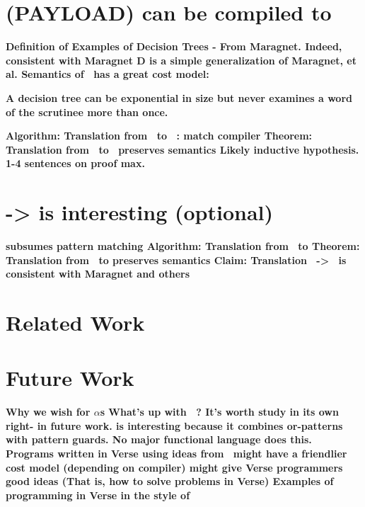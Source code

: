 \documentclass[manuscript,screen,review, 12pt]{acmart}
\begin{document}
\section{(PAYLOAD) {\VMinus} can be compiled to }
\begin{outline}[enumerate]
     \bf{Definition of \D }
     \bf{Examples of Decision Trees - From Maragnet. }
     \bf{Indeed, consistent with Maragnet }
     \bf{D is a simple generalization of Maragnet, et al. }
     \bf{Semantics of \D }
     \bf{\D\ has a great cost model: }

    \bf{A decision tree can be exponential in size but never examines a word of
    the scrutinee more than once. }

     \bf{Algorithm: Translation from \VMinus\ to \D\ : match compiler }
     \bf{Theorem: Translation from \VMinus\ to \D\ preserves semantics }
     \bf{Likely inductive hypothesis. 1-4 sentences on proof max. }
\end{outline}

\section{\PPlus -> \VMinus is interesting (optional)}
\begin{outline}[enumerate]
     \bf{\VMinus subsumes pattern matching }
     \bf{Algorithm: Translation from \PPlus\ to \VMinus}
     \bf{Theorem: Translation from \PPlus\ to \VMinus preserves semantics }
     \bf{Claim: Translation \PPlus\ -> \D\ is consistent with Maragnet and others}
\end{outline}

\section{Related Work}
\section{Future Work}
\begin{outline}[enumerate]
     \bf{Why we wish for $\alpha$s}
     \bf{What's up with \PPlus\ ? It's worth study in its own right- in future work.}
     \bf{\PPlus is interesting because it combines or-patterns with pattern }
        guards. No major functional language does this. 
     \bf{Programs written in Verse using ideas from \VMinus\ might have a }
    friendlier cost model (depending on compiler)
     \bf{\VMinus might give Verse programmers good ideas }
        (That is, how to solve problems in Verse)
     \bf{Examples of programming in Verse in the style of \VMinus }
\end{outline}
\end{document}
